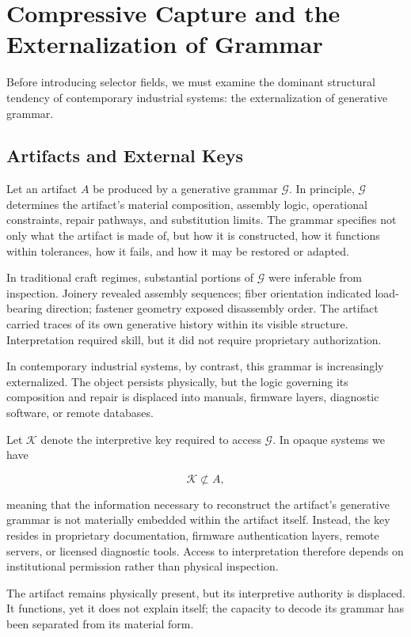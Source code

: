 \documentclass[11pt]{article}
\begin{document}
\section{Compressive Capture and the Externalization of Grammar}

Before introducing selector fields, we must examine the dominant
structural tendency of contemporary industrial systems:
the externalization of generative grammar.

\subsection{Artifacts and External Keys}

Let an artifact $A$ be produced by a generative grammar $\mathcal{G}$.
In principle, $\mathcal{G}$ determines the artifact's material composition,
assembly logic, operational constraints, repair pathways, and substitution
limits. The grammar specifies not only what the artifact is made of,
but how it is constructed, how it functions within tolerances, how it
fails, and how it may be restored or adapted.

In traditional craft regimes, substantial portions of $\mathcal{G}$ were
inferable from inspection. Joinery revealed assembly sequences; fiber
orientation indicated load-bearing direction; fastener geometry exposed
disassembly order. The artifact carried traces of its own generative
history within its visible structure. Interpretation required skill,
but it did not require proprietary authorization.

In contemporary industrial systems, by contrast, this grammar is
increasingly externalized. The object persists physically, but the
logic governing its composition and repair is displaced into manuals,
firmware layers, diagnostic software, or remote databases. 

Let $\mathcal{K}$ denote the interpretive key required to access
$\mathcal{G}$. In opaque systems we have

\[
\mathcal{K} \not\subset A,
\]

meaning that the information necessary to reconstruct the artifact's
generative grammar is not materially embedded within the artifact itself.
Instead, the key resides in proprietary documentation, firmware
authentication layers, remote servers, or licensed diagnostic tools.
Access to interpretation therefore depends on institutional permission
rather than physical inspection.

The artifact remains physically present, but its interpretive authority
is displaced. It functions, yet it does not explain itself; the capacity
to decode its grammar has been separated from its material form.
\end{document}
